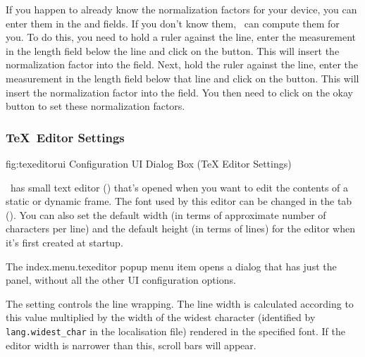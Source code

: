 If you happen to already know the normalization factors
for your device, you can enter them in the
 and
 fields. If you don't know them,
\FlowframTk\ can compute them for you. To do this, you need to hold
a ruler against the 
line, enter the measurement in the length field below the line and
\gls{click} on the  button. This
will insert the normalization factor into the
 field. Next, hold the ruler
against the  line, enter
the measurement in the length field below that line and \gls{click} on the
 button. This will insert
the normalization factor into the 
field. You then need to \gls{click} on the okay button to set these
normalization factors.

\subsubsection{\TeX\ Editor Settings}\label{sec:texeditorui}


\FloatFig
  {fig:texeditorui}
  {}
  {Configuration UI Dialog Box (TeX Editor Settings)}

\FlowframTk\ has small text editor ()
that's opened when you want to edit the contents of a static or
dynamic frame.  The font used by this editor can be changed in the
 tab ().  You
can also set the default width (in terms of approximate number of
characters per line) and the default height (in terms of lines) for
the editor when it's first created at startup.

The \gls{index.menu.texeditor} popup menu item
 opens a dialog that has just the
 panel, without all the other UI configuration
options.


The  setting controls the line
wrapping. The line width is calculated according to this value
multiplied by the width of the widest character (identified by
\verb|lang.widest_char| in the localisation file) rendered in the specified
font. If the editor width is narrower than this, scroll
bars will appear.


